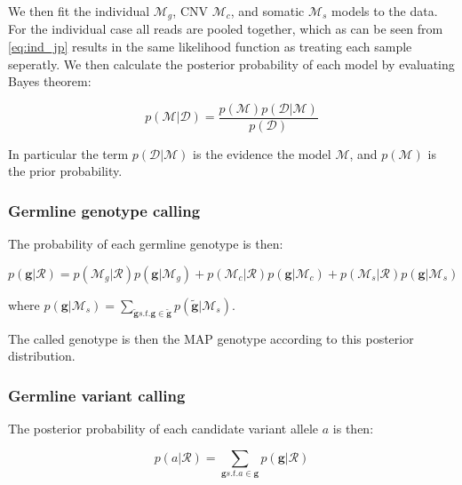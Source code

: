 \documentclass{article}
\begin{document}
We then fit the individual $\mathcal{M}_g$, CNV $\mathcal{M}_c$, and somatic $\mathcal{M}_s$ models to the data. For the individual case all reads are pooled together, which as can be seen from \ref{eq:ind_jp} results in the same likelihood function as treating each sample seperatly. We then calculate the posterior probability of each model by evaluating Bayes theorem:

\begin{equation}
\label{eq:bayes_model}
p(\mathcal{M} | \mathcal{D}) = \frac{p(\mathcal{M})p(\mathcal{D} | \mathcal{M})}{p(\mathcal{D})}
\end{equation}

In particular the term $p(\mathcal{D} | \mathcal{M})$  is the evidence the model $\mathcal{M}$, and $p(\mathcal{M})$ is the prior probability.

\subsubsection{Germline genotype calling}

The probability of each germline genotype is then:

\begin{equation}
\label{eq:som_germline_genotype}
p(\boldsymbol{g} | \mathcal{R}) = p(\mathcal{M}_g | \mathcal{R}) p(\boldsymbol{g} | \mathcal{M}_g) + p(\mathcal{M}_c | \mathcal{R}) p(\boldsymbol{g} | \mathcal{M}_c) + p(\mathcal{M}_s | \mathcal{R}) p(\boldsymbol{g} | \mathcal{M}_s)
\end{equation}

\noindent where $p(\boldsymbol{g} | \mathcal{M}_s) = \sum_{\tilde{\boldsymbol{g}} s.t. \boldsymbol{g} \in \tilde{\boldsymbol{g}}} p(\tilde{\boldsymbol{g}} | \mathcal{M}_s)$.

The called genotype is then the MAP genotype according to this posterior distribution.

\subsubsection{Germline variant calling}

The posterior probability of each candidate variant allele $a$ is then:

\begin{equation}
\label{eq:som_germline_candidate}
p(a | \mathcal{R}) = \sum_{\boldsymbol{g} s.t. a \in \boldsymbol{g}} p(\boldsymbol{g} | \mathcal{R})
\end{equation}
\end{document}
